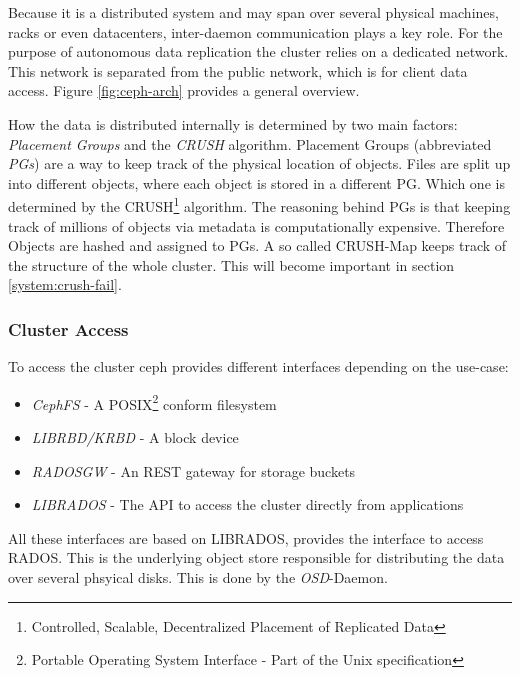 \documentclass[titlepage, a4paper, 11pt]{scrartcl}
\begin{document}
            Because it is a distributed system and may span over several physical machines, racks or even datacenters, inter-daemon
            communication plays a key role. For the purpose of autonomous data replication the cluster relies on a dedicated network.
            This network is separated from the public network, which is for client data access. Figure \ref{fig:ceph-arch} provides a 
            general overview.

            How the data is distributed internally is determined by two main factors: \textit{Placement Groups} and the \textit{CRUSH} algorithm.
            Placement Groups (abbreviated \textit{PGs}) are a way to keep track of the physical location of objects.
            Files are split up into different objects, where each object is stored in a different PG. Which one is determined by the 
            CRUSH\footnote{Controlled, Scalable, Decentralized Placement of Replicated Data} algorithm\cite{weil2007ceph}.
            The reasoning behind PGs is that keeping track of millions of objects via metadata is computationally expensive\cite{PGcephDocu}.
            Therefore Objects are hashed and assigned to PGs.
            A so called CRUSH-Map keeps track of the structure of the whole cluster. This will become important in section \ref{system:crush-fail}.

            \subsubsection{Cluster Access}

                To access the cluster ceph provides different interfaces depending on the use-case:

                \begin{itemize}
                    \item \textit{CephFS} - A POSIX\footnote{Portable Operating System Interface - Part of the Unix specification} conform filesystem
                    \item \textit{LIBRBD/KRBD} - A block device
                    \item \textit{RADOSGW} - An REST gateway for storage buckets
                    \item \textit{LIBRADOS} - The API to access the cluster directly from applications
                \end{itemize}

                All these interfaces are based on LIBRADOS, provides the interface to access RADOS. This is the underlying object store
                responsible for distributing the data over several phsyical disks. This is done by the \textit{OSD}-Daemon.
\end{document}
